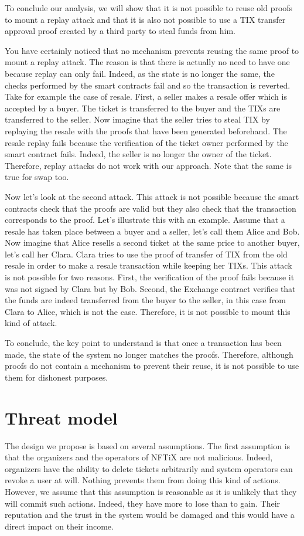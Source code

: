 \documentclass[a4paper,11pt,oneside]{report}
\begin{document}
To conclude our analysis, we will show that it is not possible to reuse old proofs to mount a replay attack and that it is also not possible to use a TIX transfer approval proof created by a third party to steal funds from him.

You have certainly noticed that no mechanism prevents reusing the same proof to mount a replay attack. The reason is that there is actually no need to have one because replay can only fail. Indeed, as the state is no longer the same, the checks performed by the smart contracts fail and so the transaction is reverted. Take for example the case of resale. First, a seller makes a resale offer which is accepted by a buyer. The ticket is transferred to the buyer and the TIXs are transferred to the seller. Now imagine that the seller tries to steal TIX by replaying the resale with the proofs that have been generated beforehand. The resale replay fails because the verification of the ticket owner performed by the smart contract fails. Indeed, the seller is no longer the owner of the ticket. Therefore, replay attacks do not work with our approach. Note that the same is true for swap too.

Now let's look at the second attack. This attack is not possible because the smart contracts check that the proofs are valid but they also check that the transaction corresponds to the proof. Let's illustrate this with an example. Assume that a resale has taken place between a buyer and a seller, let's call them Alice and Bob. Now imagine that Alice resells a second ticket at the same price to another buyer, let's call her Clara. Clara tries to use the proof of transfer of TIX from the old resale in order to make a resale transaction while keeping her TIXs. This attack is not possible for two reasons. First, the verification of the proof fails because it was not signed by Clara but by Bob. Second, the Exchange contract verifies that the funds are indeed transferred from the buyer to the seller, in this case from Clara to Alice, which is not the case. Therefore, it is not possible to mount this kind of attack.

To conclude, the key point to understand is that once a transaction has been made, the state of the system no longer matches the proofs. Therefore, although proofs do not contain a mechanism to prevent their reuse, it is not possible to use them for dishonest purposes.

\section{Threat model}
The design we propose is based on several assumptions. The first assumption is that the organizers and the operators of NFTiX are not malicious. Indeed, organizers have the ability to delete tickets arbitrarily and system operators can revoke a user at will. Nothing prevents them from doing this kind of actions. However, we assume that this assumption is reasonable as it is unlikely that they will commit such actions. Indeed, they have more to lose than to gain. Their reputation and the trust in the system would be damaged and this would have a direct impact on their income.
\end{document}
